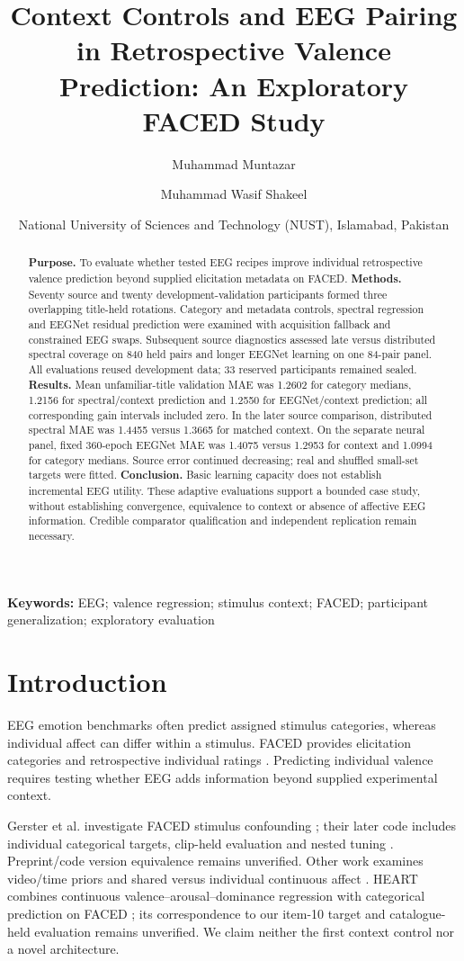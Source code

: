 \documentclass[11pt,a4paper]{article}
\title{Context Controls and EEG Pairing in Retrospective Valence Prediction: An Exploratory FACED Study}
\author{Muhammad Muntazar \and Muhammad Wasif Shakeel}
\date{National University of Sciences and Technology (NUST), Islamabad, Pakistan}
\begin{document}
\maketitle
\begin{abstract}
\textbf{Purpose.} To evaluate whether tested EEG recipes improve individual retrospective valence prediction beyond supplied elicitation metadata on FACED.
\textbf{Methods.} Seventy source and twenty development-validation participants formed three overlapping title-held rotations. Category and metadata controls, spectral regression and EEGNet residual prediction were examined with acquisition fallback and constrained EEG swaps. Subsequent source diagnostics assessed late versus distributed spectral coverage on 840 held pairs and longer EEGNet learning on one 84-pair panel. All evaluations reused development data; 33 reserved participants remained sealed.
\textbf{Results.} Mean unfamiliar-title validation MAE was 1.2602 for category medians, 1.2156 for spectral/context prediction and 1.2550 for EEGNet/context prediction; all corresponding gain intervals included zero. In the later source comparison, distributed spectral MAE was 1.4455 versus 1.3665 for matched context. On the separate neural panel, fixed 360-epoch EEGNet MAE was 1.4075 versus 1.2953 for context and 1.0994 for category medians. Source error continued decreasing; real and shuffled small-set targets were fitted.
\textbf{Conclusion.} Basic learning capacity does not establish incremental EEG utility. These adaptive evaluations support a bounded case study, without establishing convergence, equivalence to context or absence of affective EEG information. Credible comparator qualification and independent replication remain necessary.
\end{abstract}
\noindent\textbf{Keywords:} EEG; valence regression; stimulus context; FACED; participant generalization; exploratory evaluation

\section{Introduction}
EEG emotion benchmarks often predict assigned stimulus categories, whereas individual affect can differ within a stimulus. FACED provides elicitation categories and retrospective individual ratings \cite{chen2023faced}. Predicting individual valence requires testing whether EEG adds information beyond supplied experimental context.

Gerster et al. investigate FACED stimulus confounding \cite{gerster2026stimulus}; their later code includes individual categorical targets, clip-held evaluation and nested tuning \cite{gerster2026code}. Preprint/code version equivalence remains unverified. Other work examines video/time priors and shared versus individual continuous affect \cite{kong2026priors,wang2026shared}. HEART combines continuous valence--arousal--dominance regression with categorical prediction on FACED \cite{fernandez2026heart}; its correspondence to our item-10 target and catalogue-held evaluation remains unverified. We claim neither the first context control nor a novel architecture.
\end{document}
